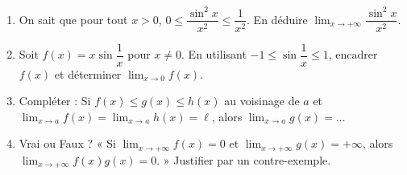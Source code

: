 \documentclass[11pt]{article}
\begin{document}
\begin{exercice}
\begin{enumerate}
    \item On sait que pour tout $x > 0$, $0 \leq \dfrac{\sin^2 x}{x^2} \leq \dfrac{1}{x^2}$. En déduire $\lim_{x \to +\infty} \dfrac{\sin^2 x}{x^2}$.
    \item Soit $f(x) = x \sin \dfrac{1}{x}$ pour $x \neq 0$. En utilisant $-1 \leq \sin \dfrac{1}{x} \leq 1$, encadrer $f(x)$ et déterminer $\lim_{x \to 0} f(x)$.
    \item Compléter : Si $f(x) \leq g(x) \leq h(x)$ au voisinage de $a$ et $\lim_{x \to a} f(x) = \lim_{x \to a} h(x) = \ell$, alors $\lim_{x \to a} g(x) = \dots$
    \item Vrai ou Faux ? « Si $\lim_{x \to +\infty} f(x) = 0$ et $\lim_{x \to +\infty} g(x) = +\infty$, alors $\lim_{x \to +\infty} f(x)g(x) = 0$. » Justifier par un contre-exemple.
\end{enumerate}
\end{exercice}
\end{document}

